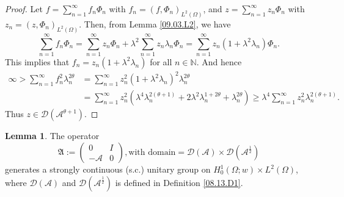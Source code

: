 \documentclass[preprint,12pt]{elsarticle}
\theoremstyle{definition}   %
\newtheorem{lemma}[theorem]{Lemma}
\numberwithin{equation}{section}
\def\mf{\mathfrak}
\def\Om{\Omega}
\def\la{\lambda}
\def\ts{\times}
\def\iy{\infty}
\def\f{\frac}
\def\mcA{\mathcal{A}}
\def\mcD{\mathcal{D}}
\newcommand{\N}{\mathbb N}
\begin{document}
\begin{proof}
	Let $f=\sum_{n=1}^\iy f_n\Phi_n$ with $f_n=(f,\Phi_n)_{L^2(\Om)}$,  and $z=\sum_{n=1}^\iy z_n \Phi_n$ with $z_n=(z,\Phi_n)_{L^2(\Om)}$. Then, from   Lemma \ref{09.03.L2}, we have 
	\begin{equation*}
		\sum_{n=1}^\iy f_n\Phi_n=\sum_{n=1}^\iy z_n\Phi_n+\la^2\sum_{n=1}^\iy z_n\la_n\Phi_n=\sum_{n=1}^\iy z_n\left(1+\la^2\la_n\right)\Phi_n.
	\end{equation*}
	This implies that $f_n=z_n(1+\la^2\la_n)$ for all $n\in\N$. And hence
	\begin{equation*}
		\begin{split} 
		\iy>\sum_{n=1}^\iy f_n^2\la_n^{2\theta}
		&=\sum_{n=1}^\iy z_n^2(1+\la^2\la_n)^2\la_n^{2\theta}\\
		&=\sum_{n=1}^\iy z_n^2\left(\la^4\la_n^{2(\theta+1)}+2  \la^2\la_n^{1+2\theta}+ \la_n^{2\theta}\right)\geq \la^4\sum_{n=1}^\iy z_n^2\la_n^{2(\theta+1)}. 
		\end{split} 
	\end{equation*}
	Thus $z\in\mcD(\mcA^{\theta+1})$. 
\end{proof}




\begin{lemma} \label{08.13.L2}
	The operator
	\begin{equation*}
		\mf{A}:=
		\begin{pmatrix}
			0 & I\\
			-\mcA &0 
		\end{pmatrix}, \mbox{with domain}=\mcD(\mcA)\ts \mcD(\mcA^\f{1}{2})
	\end{equation*}
	generates a strongly continuous (s.c.) unitary group on $H_0^1(\Om;w)\ts L^2(\Om)$, where $\mcD(\mcA)$ and $\mcD(\mcA^\f{1}{2})$ is defined in Definition \ref{08.13.D1}. 
\end{lemma}
\end{document}
